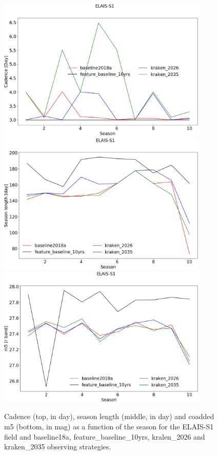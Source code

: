 

\begin{figure}[htbp]
\begin{center}
  \includegraphics[width=10cm]{Figures/ELAIS-S1_cadence.png}
  \includegraphics[width=10cm]{Figures/ELAIS-S1_season_length.png}
  \includegraphics[width=10cm]{Figures/ELAIS-S1_m5.png}
 \caption{Cadence (top, in day), season length (middle, in day) and coadded m5 (bottom, in mag) as a function of the season for the ELAIS-S1 field and baseline18a, feature\_baseline\_10yrs, kralen\_2026 and kraken\_2035 observing strategies.}\label{fig:elais-s1_cad}
\end{center}
\end{figure}

